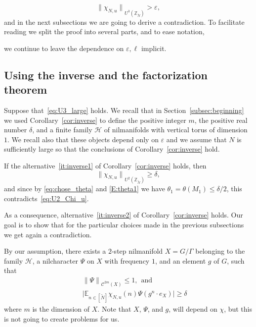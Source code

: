 \documentclass[11pt]{amsart}
\theoremstyle{definition}
\begin{document}
\begin{equation}\label{eq:U3_large}
{\lVert {\chi_{N,u}} \rVert}_{U^3({{\mathbb Z}}_{{\widetilde N}})}>{\varepsilon},
\end{equation}
and in the next subsections we are going  to derive a contradiction.
To facilitate reading we split the proof into several parts, and  to
ease notation,
  
we continue to leave  the dependence on ${\varepsilon}, \ell$ implicit.

\subsection{Using the inverse and the factorization
theorem}\label{SS:InvFact}
 Suppose that~\eqref{eq:U3_large} holds. We recall that in Section~\ref{subsec:beginning}
we used Corollary~\ref{cor:inverse}  to define the positive integer
$m$, the positive real number   $\delta$, and a finite family ${{\mathcal H}}$
of nilmanifolds with vertical torus of dimension $1$. We recall also
that these objects depend only on ${\varepsilon}$ and  we assume that $N$ is
sufficiently large so that the conclusions of
Corollary~\ref{cor:inverse} hold.

If the alternative~\eqref{it:inverse1} of
Corollary~\ref{cor:inverse} holds, then
$$
{\lVert {\chi_{N,u}} \rVert}_{U^2({{\mathbb Z}}_{{\widetilde N}})}\geq \delta,
$$
and since by  \eqref{eq:chose_theta} and \eqref{E:theta1}  we have
$\theta_1=\theta(M_1)\leq \delta/2$,  this
contradicts~\eqref{eq:U2_Chi_u}.

 As a consequence, alternative~\eqref{it:inverse2}
of Corollary~\ref{cor:inverse} holds. Our goal is  to show that for
the particular choices made in the previous subsections we get again
a contradiction.

 By our assumption, there exists a
$2$-step nilmanifold $X=G/\Gamma$ belonging to the family ${{\mathcal H}}$, a
  nilcharacter $\Psi$ on $X$ with frequency $1$, and an element $g$
of $G$, such that
\begin{align}
\label{eq:PsiCm}
 & {\lVert \Psi \rVert}_{{{\mathcal C}}^{2m}(X)}\leq 1,\ \ \text{and}   \\
\label{eq:bound1} \quad &
 \big|{{\mathbb E}}_{n\in[{{\widetilde N}}]}\chi_{N,u}(n)\Psi(g^n\cdot e_X) \big|\geq\delta
\end{align}
where $m$ is the dimension of $X$. Note that $X$, $\Psi$, and  $g$,
will depend on $\chi$, but this is not going to create problems for
us.
\end{document}
